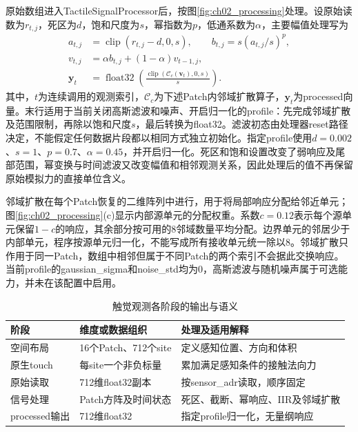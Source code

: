原始数组进入TactileSignalProcessor后，按图\ref{fig:ch02_processing}处理。设原始读数为$r_{t,j}$，死区为$d$，饱和尺度为$s$，幂指数为$p$，低通系数为$\alpha$，主要幅值处理写为
\begin{equation}
 \begin{aligned}
 a_{t,j}&=\operatorname{clip}(r_{t,j}-d,0,s),\qquad
 b_{t,j}=s(a_{t,j}/s)^p,\\
 v_{t,j}&=\alpha b_{t,j}+(1-\alpha)v_{t-1,j},\\
 \boldsymbol y_t&=\operatorname{float32}\!\left(
 \frac{\operatorname{clip}(\mathcal C_c(\boldsymbol v_t),0,s)}{s}\right).
 \end{aligned}
 \label{eq:ch02_processing}
\end{equation}
其中，$t$为连续调用的观测索引，$\mathcal C_c$为下述Patch内邻域扩散算子，$\boldsymbol y_t$为processed向量。末行适用于当前关闭高斯滤波和噪声、开启归一化的profile：先完成邻域扩散及范围限制，再除以饱和尺度$s$，最后转换为float32。滤波初态由处理器reset路径决定，不能假定任何数据片段都以相同方式独立初始化。指定profile使用$d=0.002$、$s=1$、$p=0.7$、$\alpha=0.45$，并开启归一化。死区和饱和设置改变了弱响应及尾部范围，幂变换与时间滤波又改变幅值和相邻观测关系，因此处理后的值不再保留原始模拟力的直接单位含义。

邻域扩散在每个Patch恢复的二维阵列中进行，用于将局部响应分配给邻近单元；图\ref{fig:ch02_processing}(c)显示内部源单元的分配权重。系数$c=0.12$表示每个源单元保留$1-c$的响应，其余部分按可用的8邻域数量平均分配。边界单元的邻居少于内部单元，程序按源单元归一化，不能写成所有接收单元统一除以8。邻域扩散只作用于同一Patch，数组中相邻但属于不同Patch的两个索引不会据此交换响应。当前profile的gaussian\_sigma和noise\_std均为0，高斯滤波与随机噪声属于可选能力，并未在该配置中启用。

\begin{table}[htbp]
  \centering\small
  \caption{触觉观测各阶段的输出与语义}
  \label{tab:ch02_signal_stages}
  \begin{tabular}{p{}p{}p{}}
    \hline
    阶段 & 维度或数据组织 & 处理及适用解释\\
    \hline
    空间布局 & 16个Patch、712个site & 定义感知位置、方向和体积\\
    原生touch & 每site一个非负标量 & 累加满足感知条件的接触法向力\\
    原始读取 & 712维float32副本 & 按sensor\_adr读取，顺序固定\\
    信号处理 & Patch方阵及时间状态 & 死区、截断、幂响应、IIR及邻域扩散\\
    processed输出 & 712维float32 & 指定profile归一化，无量纲响应\\
    \hline
  \end{tabular}
\end{table}

